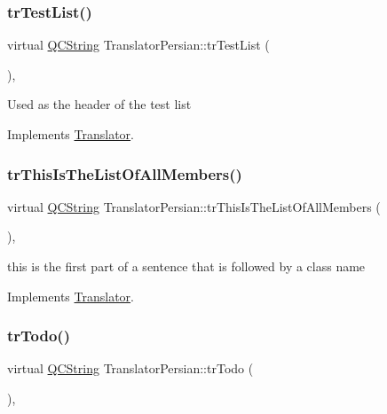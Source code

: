 \subsubsection{\texorpdfstring{trTestList()}{trTestList()}}
{\footnotesize\ttfamily virtual \mbox{\hyperlink{class_q_c_string}{Q\+C\+String}} Translator\+Persian\+::tr\+Test\+List (\begin{DoxyParamCaption}{ }\end{DoxyParamCaption})\hspace{0.3cm}{\ttfamily [inline]}, {\ttfamily [virtual]}}

Used as the header of the test list 

Implements \mbox{\hyperlink{class_translator}{Translator}}.

\mbox{\label{class_translator_persian_a67513595325c35e9a46231a1448eb83f}} 
\subsubsection{\texorpdfstring{trThisIsTheListOfAllMembers()}{trThisIsTheListOfAllMembers()}}
{\footnotesize\ttfamily virtual \mbox{\hyperlink{class_q_c_string}{Q\+C\+String}} Translator\+Persian\+::tr\+This\+Is\+The\+List\+Of\+All\+Members (\begin{DoxyParamCaption}{ }\end{DoxyParamCaption})\hspace{0.3cm}{\ttfamily [inline]}, {\ttfamily [virtual]}}

this is the first part of a sentence that is followed by a class name 

Implements \mbox{\hyperlink{class_translator}{Translator}}.

\mbox{\label{class_translator_persian_a4ca4e6cbb7d59ad56019fc12d6cfc09c}} 
\subsubsection{\texorpdfstring{trTodo()}{trTodo()}}
{\footnotesize\ttfamily virtual \mbox{\hyperlink{class_q_c_string}{Q\+C\+String}} Translator\+Persian\+::tr\+Todo (\begin{DoxyParamCaption}{ }\end{DoxyParamCaption})\hspace{0.3cm}{\ttfamily [inline]}, {\ttfamily [virtual]}}

